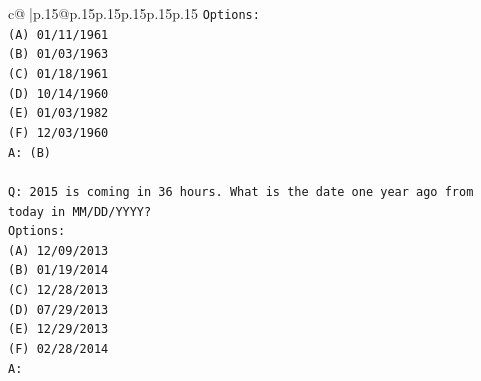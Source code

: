 \documentclass{article}
\begin{document}
{\begin{supertabular}{c@{$\;$}|p{.15\linewidth}@{}p{.15\linewidth}p{.15\linewidth}p{.15\linewidth}p{.15\linewidth}p{.15\linewidth}}
{{{\texttt{Options:} \\
\texttt{(A) 01/11/1961} \\
\texttt{(B) 01/03/1963} \\
\texttt{(C) 01/18/1961} \\
\texttt{(D) 10/14/1960} \\
\texttt{(E) 01/03/1982} \\
\texttt{(F) 12/03/1960} \\
\texttt{A: (B)} \\
\\ 
\texttt{Q: 2015 is coming in 36 hours. What is the date one year ago from today in MM/DD/YYYY?} \\
\texttt{Options:} \\
\texttt{(A) 12/09/2013} \\
\texttt{(B) 01/19/2014} \\
\texttt{(C) 12/28/2013} \\
\texttt{(D) 07/29/2013} \\
\texttt{(E) 12/29/2013} \\
\texttt{(F) 02/28/2014} \\
\texttt{A:} \\
            }
        }
    }
     \\ \\


\end{supertabular}}
\end{document}
